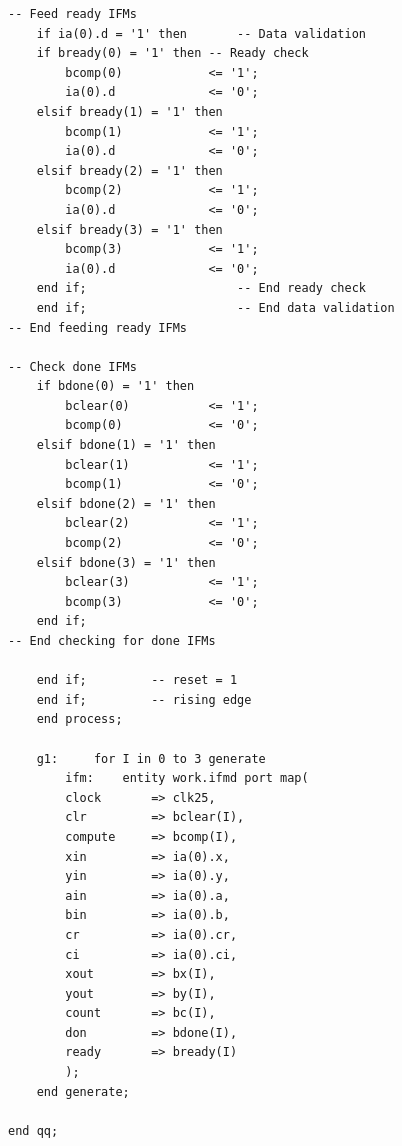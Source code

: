 \documentclass{article}
\begin{document}
\begin{lstlisting}
-- Feed ready IFMs
	if ia(0).d = '1' then		-- Data validation
	if bready(0) = '1' then -- Ready check
		bcomp(0)			<= '1';
		ia(0).d				<= '0';
	elsif bready(1) = '1' then
		bcomp(1)			<= '1';
		ia(0).d				<= '0';
	elsif bready(2) = '1' then
		bcomp(2)			<= '1';
		ia(0).d				<= '0';
	elsif bready(3) = '1' then 
		bcomp(3)			<= '1';
		ia(0).d				<= '0';
	end if;						-- End ready check
	end if;						-- End data validation
-- End feeding ready IFMs

-- Check done IFMs
	if bdone(0) = '1' then
		bclear(0)			<= '1';
		bcomp(0)			<= '0';
	elsif bdone(1) = '1' then
		bclear(1)			<= '1';
		bcomp(1)			<= '0';
	elsif bdone(2) = '1' then
		bclear(2)			<= '1';
		bcomp(2)			<= '0';
	elsif bdone(3) = '1' then
		bclear(3)			<= '1';
		bcomp(3)			<= '0';
	end if;
-- End checking for done IFMs

	end if;			-- reset = 1
	end if;			-- rising edge
	end process;

	g1:		for I in 0 to 3 generate
		ifm:	entity work.ifmd port map(
		clock		=> clk25,
		clr			=> bclear(I),
		compute		=> bcomp(I),
		xin			=> ia(0).x,
		yin			=> ia(0).y,
		ain			=> ia(0).a,
		bin			=> ia(0).b,
		cr			=> ia(0).cr,
		ci			=> ia(0).ci,
		xout		=> bx(I),
		yout		=> by(I),
		count		=> bc(I),
		don			=> bdone(I),
		ready		=> bready(I)
		);
	end generate;

end qq;
\end{lstlisting}
\end{document}
